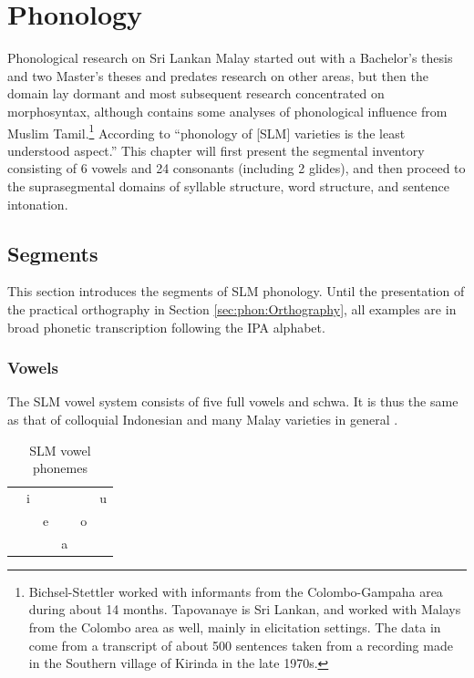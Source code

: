 
\chapter{Phonology}

Phonological research on Sri Lankan Malay started out with a Bachelor's thesis \citep{Tapovanaye1986} and two Master's theses    \citep{Bichsel, Tapovanaye1995} and predates research on other areas, but then the domain lay dormant and most subsequent research concentrated on morphosyntax, although \citet{SmithEtAl2004} contains some analyses of phonological influence from Muslim Tamil.\footnote{Bichsel-Stettler worked with informants  from the Colombo-Gampaha area during about 14 months. Tapovanaye is Sri Lankan, and worked with Malays from the Colombo area as well, mainly in elicitation settings. The data in \citet{SmithEtAl2004} come from a transcript of about 500 sentences taken from a recording  made in the Southern village of Kirinda in the late 1970s.} According to \citet{Ansaldo2005kirinda} ``phonology of [SLM] varieties is the least understood aspect.''
This chapter will first present the segmental inventory consisting of 6 vowels and 24 consonants (including 2 glides), and then proceed to the suprasegmental domains of syllable structure, word structure, and sentence intonation.


\section{Segments}\label{sec:phon:Segments}
\glossIPAmode
This section  introduces the segments of SLM phonology. Until the presentation of the practical orthography in Section \ref{sec:phon:Orthography}, all examples are in broad phonetic transcription following the IPA alphabet.

\subsection{Vowels}\label{sec:phon:Vowels}
The SLM vowel system consists of five full vowels and schwa. It is thus the same as that of colloquial Indonesian \citep[229]{Ewing2005} and many Malay varieties in general \citep{Adelaar1985,Adelaar2005struct}. 

\begin{table}[!h]
    \centering
        \begin{tabular}{rccccc}
                &  i    &  	 &        	 &  		 &   u   \\
                &       &  e &  \textipa{@}       &  o &      \\
                &       &   &    a   &   &      \\
        \end{tabular}
    \caption{SLM vowel phonemes}
    \label{tab:SLMVowelPhonemcdes}
\end{table}

